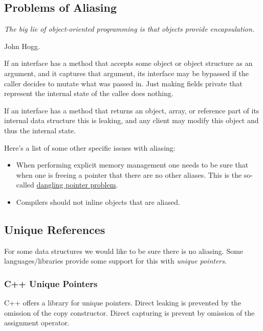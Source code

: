 \documentclass{article}
\begin{document}
\subsection{Problems of Aliasing}

\epigraph{\itshape The big lie of object-oriented programming is that objects provide encapsulation.}{John Hogg.}

\begin{remark}\label{remark:captures}
If an interface has a method that accepts some object or object structure as an argument, and it captures that argument, its interface may be bypassed if the caller decides to mutate what was passed in.
Just making fields private that represent the internal state of the callee does nothing.
\end{remark}

\begin{remark}\label{remark:leaks}
If an interface has a method that returns an object, array, or reference part of its internal data structure this is leaking, and any client may modify this object and thus the internal state.
\end{remark}

Here's a list of some other specific issues with aliasing:
\begin{itemize}
\item When performing explicit memory management one needs to be sure that when one is freeing a pointer that there are no other aliases. This is the so-called \href{https://en.wikipedia.org/wiki/Dangling_pointer}{dangling pointer problem}.
\item Compilers should not inline objects that are aliased.
\end{itemize}

\subsection{Unique References}

For some data structures we would like to be sure there is no aliasing.
Some languages/libraries provide some support for this with \textit{unique pointers}.

\subsubsection{C++ Unique Pointers}

C++ offers a library for unique pointers.
Direct leaking is prevented by the omission of the copy constructor.
Direct capturing is prevent by omission of the assignment operator.
\end{document}
